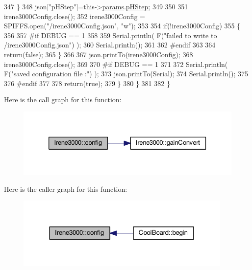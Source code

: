 \begin{DoxyCode}
347             \}
348             json[\textcolor{stringliteral}{"pHStep"}]=this->\hyperlink{class_irene3000_a136585a5ee7f9ac6ab52175fa153f8e3}{params}.\hyperlink{struct_irene3000_1_1parameters___t_a61cfcc2539d5f630e9071f3753aba9fe}{pHStep};
349 
350 
351             irene3000Config.close();
352             irene3000Config = SPIFFS.open(\textcolor{stringliteral}{"/irene3000Config.json"}, \textcolor{stringliteral}{"w"});
353 
354             \textcolor{keywordflow}{if}(!irene3000Config)
355             \{
356             
357 \textcolor{preprocessor}{            #if DEBUG == 1}
358 
359                 Serial.println( F(\textcolor{stringliteral}{"failed to write to /irene3000Config.json"}) );
360                 Serial.println();
361             
362 \textcolor{preprocessor}{            #endif }
363 
364                 \textcolor{keywordflow}{return}(\textcolor{keyword}{false});
365             \}
366 
367             json.printTo(irene3000Config);
368             irene3000Config.close();
369             
370 \textcolor{preprocessor}{        #if DEBUG == 1 }
371 
372             Serial.println( F(\textcolor{stringliteral}{"saved configuration file :"})  );
373             json.printTo(Serial);
374             Serial.println();
375         
376 \textcolor{preprocessor}{        #endif}
377 
378             \textcolor{keywordflow}{return}(\textcolor{keyword}{true}); 
379         \}
380     \}   
381 
382 \}
\end{DoxyCode}
Here is the call graph for this function\+:\nopagebreak
\begin{figure}[H]
\begin{center}
\leavevmode
\includegraphics[width=326pt]{d6/d03/class_irene3000_afed5c35e4b23963c157847ef27c11e9c_cgraph}
\end{center}
\end{figure}
Here is the caller graph for this function\+:\nopagebreak
\begin{figure}[H]
\begin{center}
\leavevmode
\includegraphics[width=300pt]{d6/d03/class_irene3000_afed5c35e4b23963c157847ef27c11e9c_icgraph}
\end{center}
\end{figure}
\mbox{\label{class_irene3000_abcad62d1201a59f8dd3ba87048002728}} 
